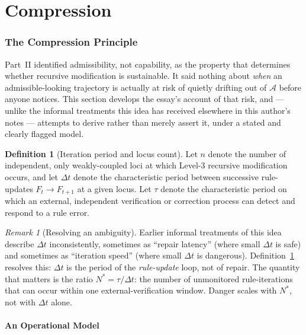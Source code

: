 \documentclass[12pt,a4paper]{article}
\theoremstyle{plain}
\theoremstyle{definition}
\newtheorem{definition}[theorem]{Definition}
\theoremstyle{remark}
\newtheorem{remark}[theorem]{Remark}
\newcommand{\Adm}{\mathcal{A}}
\begin{document}
\part{Compression}

\section{The Compression Principle}
\label{sec:compression-principle}

Part~II identified admissibility, not capability, as the property that determines whether recursive modification is sustainable. It said nothing about \emph{when} an admissible-looking trajectory is actually at risk of quietly drifting out of $\Adm$ before anyone notices. This section develops the essay's account of that risk, and — unlike the informal treatments this idea has received elsewhere in this author's notes — attempts to derive rather than merely assert it, under a stated and clearly flagged model.

\begin{definition}[Iteration period and locus count]
\label{def:compression-vars}
Let $n$ denote the number of independent, only weakly-coupled loci at which Level-3 recursive modification occurs, and let $\Delta t$ denote the characteristic period between successive rule-updates $F_t \to F_{t+1}$ at a given locus. Let $\tau$ denote the characteristic period on which an external, independent verification or correction process can detect and respond to a rule error.
\end{definition}

\begin{remark}[Resolving an ambiguity]
Earlier informal treatments of this idea describe $\Delta t$ inconsistently, sometimes as ``repair latency'' (where small $\Delta t$ is safe) and sometimes as ``iteration speed'' (where small $\Delta t$ is dangerous). Definition~\ref{def:compression-vars} resolves this: $\Delta t$ is the period of the \emph{rule-update} loop, not of repair. The quantity that matters is the ratio $N^\ast = \tau/\Delta t$: the number of unmonitored rule-iterations that can occur within one external-verification window. Danger scales with $N^\ast$, not with $\Delta t$ alone.
\end{remark}

\subsection{An Operational Model}
\label{subsec:operational-risk-model}
\end{document}
